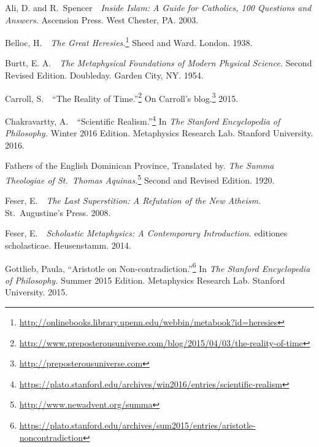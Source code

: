 \documentclass[twocolumn]{article}
\begin{document}
\begin{thebibliography}{}

   \begin{small}

      Ali, D. and R.~Spencer\ \ {\it Inside Islam: A Guide for Catholics, 100
      Questions and Answers.}  Ascension Press.  West Chester, PA.  2003.

      Belloc, H.\ \ {\it The Great Heresies.}\footnote{%
         \url{http://onlinebooks.library.upenn.edu/webbin/metabook?id=heresies}
      }
      Sheed and Ward.  London.  1938.

      Burtt, E. A.\ \ {\it The Metaphysical Foundations of Modern Physical
      Science.}  Second Revised Edition.  Doubleday.  Garden City, NY.  1954.

      Carroll, S.\ \ ``The Reality of Time.''\footnote{%
         \url{http://www.preposterousuniverse.com/blog/2015/04/03/the-reality-of-time}%
      }
      On Carroll's blog.\footnote{\url{http://preposterousuniverse.com}}  2015.

      Chakravartty, A.\ \ ``Scientific Realism.''\footnote{%
         \url{https://plato.stanford.edu/archives/win2016/entries/scientific-realism}%
      }
      In {\it The Stanford Encyclopedia of Philosophy.}  Winter 2016 Edition.
      Metaphysics Research Lab.  Stanford University.  2016.

      Fathers of the English Dominican Province, Translated by. {\it The
      Summa Theologiae of St.~Thomas Aquinas.}\footnote{%
         \url{http://www.newadvent.org/summa}%
      }
      Second and Revised Edition.  1920.

      Feser, E.\ \ {\it The Last Superstition: A Refutation of the New
      Atheism.}  St.~Augustine's Press.  2008.

      Feser, E.\ \ {\it Scholastic Metaphysics: A Contemporary Introduction.}
      editiones scholasticae.  Heusenstamm.  2014.

      Gottlieb, Paula, ``Aristotle on Non-contradiction.''\footnote{%
         \url{https://plato.stanford.edu/archives/sum2015/entries/aristotle-noncontradiction}%
      }
      In {\it The Stanford Encyclopedia of Philosophy.}  Summer 2015 Edition.
      Metaphysics Research Lab.  Stanford University.  2015.


\end{small}
\end{thebibliography}
\end{document}
